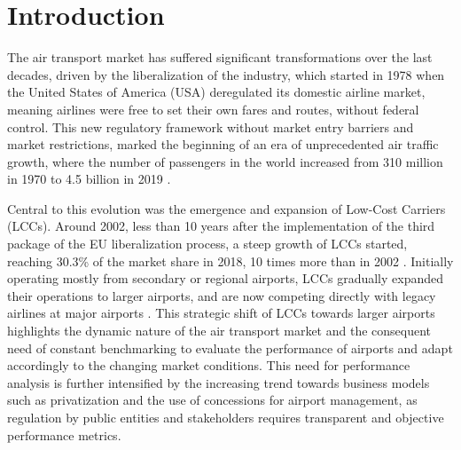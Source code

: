 
\section{Introduction}
\label{sec:intro}

The air transport market has suffered significant transformations over the last decades, driven by the
liberalization of the industry, which started in 1978 when the United States of America (USA) deregulated
its domestic airline market, meaning airlines were free to set their own fares and routes, without federal
control. This new regulatory framework without market entry
barriers and market restrictions, marked the beginning of an era of unprecedented air traffic growth, where the number of passengers in the world increased from 310 million in 1970 to 4.5 billion in 2019 \cite{baltagi1995}\cite{worldevolution}.

Central to this evolution was the emergence and expansion of Low-Cost Carriers (LCCs). Around 2002, less than 10 years after the implementation of the third package of the EU liberalization process, a steep growth of LCCs started, reaching
30.3\% of the market share in 2018, 10 times more than in 2002 \cite{sharelcc}. Initially operating mostly from secondary or regional airports,
LCCs gradually expanded their operations to larger airports, and are now competing directly with legacy
airlines at major airports \cite{jimenez2020}. This strategic shift of LCCs towards larger airports highlights
the dynamic nature of the air transport market and the consequent need of constant benchmarking to evaluate the performance of airports and adapt accordingly to the changing market conditions. This need for performance analysis is further intensified by the increasing trend towards business
models such as privatization and the use of concessions for airport management, as regulation by public
entities and stakeholders requires transparent and objective performance metrics.


